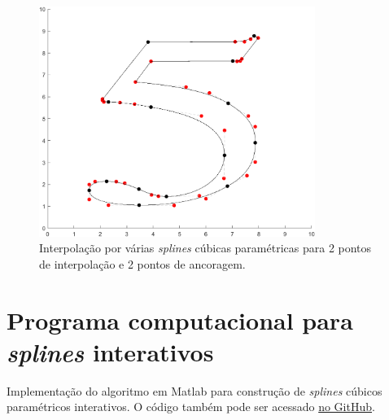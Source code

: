 \documentclass{article}
\begin{document}
\begin{enumerate}
\begin{enumerate}
                    \begin{figure}[!h]
                        \centering
                        \includegraphics[width=0.8\textwidth]{images/5.png}
                        \caption{Interpolação por várias \textit{splines} cúbicas paramétricas
                        para 2 pontos de interpolação e 2 pontos de ancoragem.}
                        \label{fig:5}
                    \end{figure}
                                        
            \end{enumerate}

    \end{enumerate}

    \clearpage

    \appendix

    \section{Programa computacional para \textit{splines} interativos}
        \label{appendix:splines}

        Implementação do algoritmo em Matlab
        para construção de \textit{splines} cúbicos paramétricos
        interativos. O código também pode ser acessado
        \href{https://github.com/lucasresck/introduction-to-numerical-analysis/blob/master/list_3/interactive_spline.m}{no GitHub}.
\end{document}
